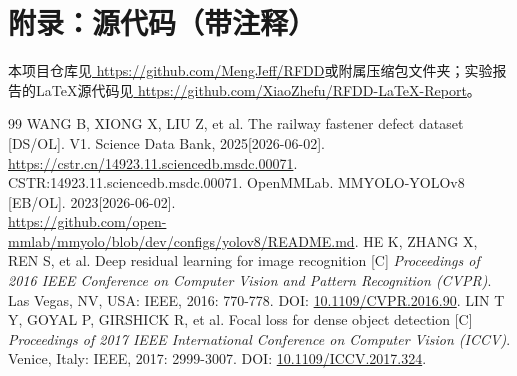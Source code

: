 \documentclass[12pt, oneside, a4paper]{ctexart}
\begin{document}
\section{附录：源代码（带注释）}
本项目仓库见\href{https://github.com/MengJeff/RFDD}{\color{blue} https://github.com/MengJeff/RFDD}或附属压缩包文件夹；实验报告的\LaTeX{}源代码见\href{https://github.com/XiaoZhefu/RFDD-LaTeX-Report}{\color{blue} https://github.com/XiaoZhefu/RFDD-LaTeX-Report}。
\par{}
\quad{}
\par{}
\begin{flushleft}
    \begin{small}
        \begin{thebibliography}{99}
            WANG B, XIONG X, LIU Z, et al. The railway fastener defect dataset [DS/OL].
            V1. Science Data Bank, 2025[2026-06-02]. \\
            \href{https://cstr.cn/14923.11.sciencedb.msdc.00071}{\color{blue} https://cstr.cn/14923.11.sciencedb.msdc.00071}.
            CSTR:14923.11.sciencedb.msdc.00071.
            \vspace{-3mm}
             OpenMMLab. MMYOLO-YOLOv8 [EB/OL]. 2023[2026-06-02]. \\
            \href{https://github.com/open-mmlab/mmyolo/blob/dev/configs/yolov8/README.md}{\color{blue} https://github.com/open-mmlab/mmyolo/blob/dev/configs/yolov8/README.md}.
            \vspace{-3mm}
            HE K, ZHANG X, REN S, et al. Deep residual learning for image recognition [C]
            \textit{Proceedings of 2016 IEEE Conference on Computer Vision and Pattern Recognition (CVPR)}.
            Las Vegas, NV, USA: IEEE, 2016: 770-778.
            DOI: \href{https://doi.org/10.1109/CVPR.2016.90}{\color{blue} 10.1109/CVPR.2016.90}.
            \vspace{-3mm}
            LIN T Y, GOYAL P, GIRSHICK R, et al. Focal loss for dense object detection [C]
            \textit{Proceedings of 2017 IEEE International Conference on Computer Vision (ICCV)}.
            Venice, Italy: IEEE, 2017: 2999-3007.
            DOI: \href{https://doi.org/10.1109/ICCV.2017.324}{\color{blue} 10.1109/ICCV.2017.324}.
            \vspace{-3mm}
        \end{thebibliography}
    \end{small}
\end{flushleft}
\end{document}
